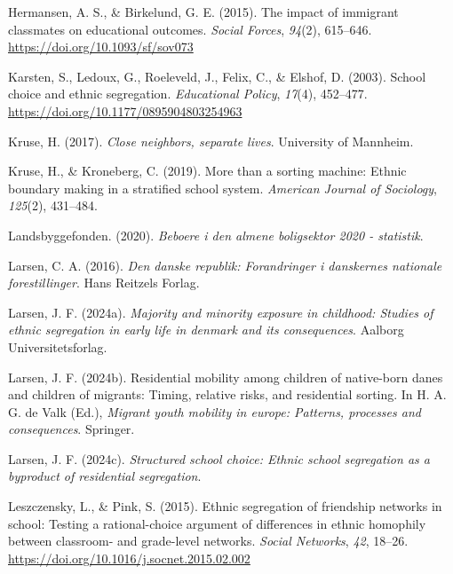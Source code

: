 \documentclass[
]{book}
\newlength{\cslhangindent}
\newlength{\cslentryspacingunit} %
\newenvironment{CSLReferences}[2] %
 {%
  \setlength{\parindent}{0pt}
  \ifodd #1
  \let\oldpar\par
  \def\par{\hangindent=\cslhangindent\oldpar}
  \fi
  \setlength{\parskip}{#2\cslentryspacingunit}
 }%
 {}
\begin{document}
\begin{CSLReferences}{1}{0}
\leavevmode{}%
Hermansen, A. S., \& Birkelund, G. E. (2015). The impact of immigrant classmates on educational outcomes. \emph{Social Forces}, \emph{94}(2), 615--646. \url{https://doi.org/10.1093/sf/sov073}

\leavevmode{}%
Karsten, S., Ledoux, G., Roeleveld, J., Felix, C., \& Elshof, D. (2003). School choice and ethnic segregation. \emph{Educational Policy}, \emph{17}(4), 452--477. \url{https://doi.org/10.1177/0895904803254963}

\leavevmode{}%
Kruse, H. (2017). \emph{Close neighbors, separate lives}. University of Mannheim.

\leavevmode{}%
Kruse, H., \& Kroneberg, C. (2019). More than a sorting machine: Ethnic boundary making in a stratified school system. \emph{American Journal of Sociology}, \emph{125}(2), 431--484.

\leavevmode{}%
Landsbyggefonden. (2020). \emph{Beboere i den almene boligsektor 2020 - statistik}.

\leavevmode{}%
Larsen, C. A. (2016). \emph{Den danske republik: Forandringer i danskernes nationale forestillinger}. Hans Reitzels Forlag.

\leavevmode{}%
Larsen, J. F. (2024a). \emph{Majority and minority exposure in childhood: Studies of ethnic segregation in early life in denmark and its consequences}. Aalborg Universitetsforlag.

\leavevmode{}%
Larsen, J. F. (2024b). Residential mobility among children of native-born danes and children of migrants: Timing, relative risks, and residential sorting. In H. A. G. de Valk (Ed.), \emph{Migrant youth mobility in europe: Patterns, processes and consequences}. Springer.

\leavevmode{}%
Larsen, J. F. (2024c). \emph{Structured school choice: Ethnic school segregation as a byproduct of residential segregation}.

\leavevmode{}%
Leszczensky, L., \& Pink, S. (2015). Ethnic segregation of friendship networks in school: Testing a rational-choice argument of differences in ethnic homophily between classroom- and grade-level networks. \emph{Social Networks}, \emph{42}, 18--26. \url{https://doi.org/10.1016/j.socnet.2015.02.002}


\end{CSLReferences}
\end{document}
